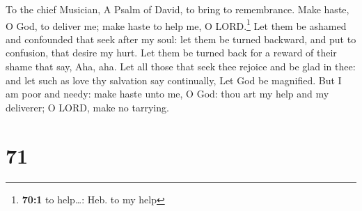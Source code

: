 To the chief Musician, A Psalm of David, to bring to remembrance.
 Make haste, O God, to deliver me; make haste to help me,
O LORD.\footnote{\textbf{70:1} to help\ldots: Heb. to my help}
 Let them be ashamed and confounded that seek after my
soul: let them be turned backward, and put to confusion, that desire my
hurt.  Let them be turned back for a reward of their shame
that say, Aha, aha.  Let all those that seek thee rejoice
and be glad in thee: and let such as love thy salvation say continually,
Let God be magnified.  But I am poor and needy: make haste
unto me, O God: thou art my help and my deliverer; O LORD, make no
tarrying.

\hypertarget{section-70}{%
\section{71}\label{section-70}}

